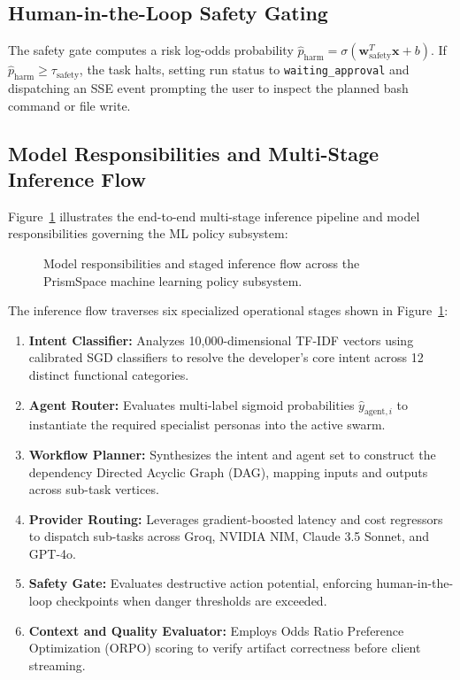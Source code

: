 \documentclass[12pt,a4paper]{report}
\begin{document}
\subsection{Human-in-the-Loop Safety Gating}
The safety gate computes a risk log-odds probability $\hat{p}_{\text{harm}} = \sigma(\mathbf{w}_{\text{safety}}^T \mathbf{x} + b)$. If $\hat{p}_{\text{harm}} \ge \tau_{\text{safety}}$, the task halts, setting run status to \texttt{waiting\_approval} and dispatching an SSE event prompting the user to inspect the planned bash command or file write.

\subsection{Model Responsibilities and Multi-Stage Inference Flow}
Figure~\ref{fig:ml_inference_flow} illustrates the end-to-end multi-stage inference pipeline and model responsibilities governing the ML policy subsystem:

\begin{figure}[H]
    \centering
    \caption{Model responsibilities and staged inference flow across the PrismSpace machine learning policy subsystem.}
    \label{fig:ml_inference_flow}
\end{figure}

The inference flow traverses six specialized operational stages shown in Figure~\ref{fig:ml_inference_flow}:
\begin{enumerate}
    \item \textbf{Intent Classifier:} Analyzes 10,000-dimensional TF-IDF vectors using calibrated SGD classifiers to resolve the developer's core intent across 12 distinct functional categories.
    \item \textbf{Agent Router:} Evaluates multi-label sigmoid probabilities $\hat{y}_{\text{agent}, i}$ to instantiate the required specialist personas into the active swarm.
    \item \textbf{Workflow Planner:} Synthesizes the intent and agent set to construct the dependency Directed Acyclic Graph (DAG), mapping inputs and outputs across sub-task vertices.
    \item \textbf{Provider Routing:} Leverages gradient-boosted latency and cost regressors to dispatch sub-tasks across Groq, NVIDIA NIM, Claude 3.5 Sonnet, and GPT-4o.
    \item \textbf{Safety Gate:} Evaluates destructive action potential, enforcing human-in-the-loop checkpoints when danger thresholds are exceeded.
    \item \textbf{Context and Quality Evaluator:} Employs Odds Ratio Preference Optimization (ORPO) scoring to verify artifact correctness before client streaming.
\end{enumerate}
\end{document}
